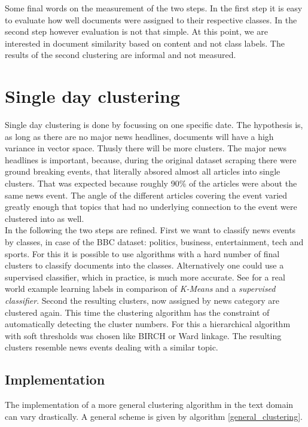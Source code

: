 Some final words on the measurement of the two steps. In the first step it is easy to evaluate how well documents were assigned to their respective classes. In the second step however evaluation is not that simple. At this point, we are interested in document similarity based on content and not class labels. The results of the second clustering are informal and not measured.

\section{Single day clustering}

Single day clustering is done by focussing on one specific date. The hypothesis is, as long as there are no major news headlines, documents will have a high variance in vector space. Thusly there will be more clusters. The major news headlines is important, because, during the original dataset scraping there were ground breaking events, that literally absored almost all articles into single clusters. That was expected because roughly 90\% of the articles were about the same news event. The angle of the different articles covering the event varied greatly enough that topics that had no underlying connection to the event were clustered into as well.\\

In the following the two steps are refined. First we want to classify news events by classes, in case of the BBC dataset: politics, business, entertainment, tech and sports. For this it is possible to use algorithms with a hard number of final clusters to classify documents into the classes. Alternatively one could use a supervised classifier, which in practice, is much more accurate. See \cite{LearningMultiLabelKmeans2013} for a real world example learning labels in comparison of \emph{K-Means} and a \emph{supervised classifier}. Second the resulting clusters, now assigned by news category are clustered again. This time the clustering algorithm has the constraint of automatically detecting the cluster numbers. For this a hierarchical algorithm with soft thresholds was chosen like BIRCH or Ward linkage. The resulting clusters resemble news events dealing with a similar topic. 

  \subsection{Implementation}
  The implementation of a more general clustering algorithm in the text domain can vary drastically. A general scheme is given by algorithm \ref{general_clustering}.


